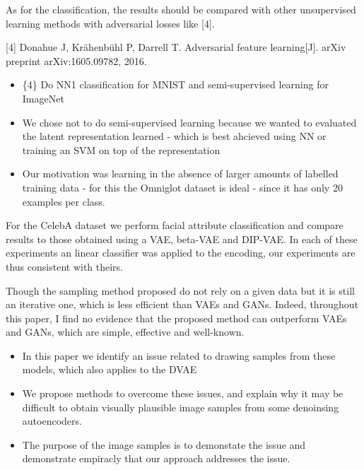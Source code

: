 \documentclass{article}
\begin{document}

{\color{blue}
As for the classification, the results should be compared with other unsupervised learning methods with adversarial losses like [4].

[4] Donahue J, Krähenbühl P, Darrell T. Adversarial feature learning[J]. arXiv preprint arXiv:1605.09782, 2016.}

\begin{itemize}
    \item \{4\} Do NN1 classification for MNIST and semi-supervised learning for ImageNet
    \item We chose not to do semi-supervised learning because we wanted to evaluated the latent representation learned - which is best ahcieved using NN or training an SVM on top of the representation
    \item Our motivation was learning in the absence of larger amounts of labelled training data - for this the Omniglot dataset is ideal - since it has only 20 examples per class.
\end{itemize}

{\color{red} For the CelebA dataset we perform facial attribute classification and compare results to those obtained using a VAE, beta-VAE and DIP-VAE. In each of these experiments an linear classifier was applied to the encoding, our experiments are thus consistent with theirs.}

{\color{blue}
Though the sampling method proposed do not rely on a given data but it is still an iterative one, which is less efficient than VAEs and GANs. Indeed, throughout this paper, I find no evidence that the proposed method can outperform VAEs and GANs, which are simple, effective and well-known.}\\


\begin{itemize}
    \item In this paper we identify an issue related to drawing samples from these models, which also applies to the DVAE
    \item We propose methods to overcome these issues, and explain why it may be difficult to obtain visually plausible image samples from some denoinsing autoencoders.
    \item {\color{red} The purpose of the image samples is to demonstate the issue and demonstrate empiracly that our approach addresses the issue.}
\end{itemize}
\end{document}
